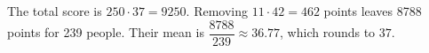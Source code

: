 The total score is $250\cdot37=9250$. Removing $11\cdot42=462$ points leaves 8788 points for 239 people. Their mean is $\dfrac{8788}{239}\approx36.77$, which rounds to $\boxed{37}$.
